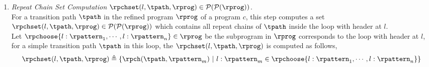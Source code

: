 \begin{enumerate}
%
\item 
\emph{Repeat Chain Set Computation}
$\rpchset(l, \tpath, \rprog) \in \mathcal{P}(\mathcal{P}(\rprog))$.
\\
For a transition path $\tpath$ in the refined program $\rprog$ of a program $c$, 
this step computes a set 
$\rpchset(l, \tpath, \rprog) \in \mathcal{P}(\mathcal{P}(\rprog))$
which contains
 all repeat chains of $\tpath$ inside the loop with header at $l$.
 \\
Let $\rpchoose{l: \rpattern_1, \cdots, l: \rpattern_n}  \in \rprog$
be the subprogram in $\rprog$ corresponds to the  loop with header at $l$, for a simple transition path $\tpath$ in this loop,
the $\rpchset(l, \tpath, \rprog)$ is computed as follows,
 \[
    \rpchset(l, \tpath, \rprog) \triangleq \left\{\rpch(\tpath, \rpattern_m)
    ~\middle\vert~
    l : \rpattern_m \in \rpchoose{l: \rpattern_1, \cdots, l: \rpattern_n} 
    \right\}
 \]
%
  

\end{enumerate}
